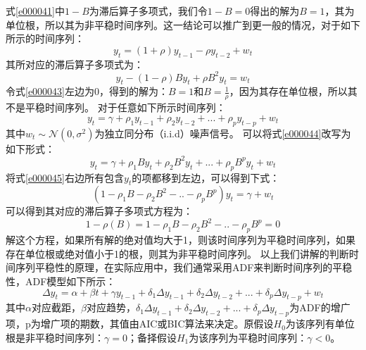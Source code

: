 \documentclass{article}
\begin{document}
式\ref{e000041}中$1-B$为滞后算子多项式，我们令$1-B=0$得出的解为$B=1$，其为单位根，所以其为非平稳时间序列。这一结论可以推广到更一般的情况，对于如下所示的时间序列：
\begin{equation}
y_{t}=(1+\rho)y_{t-1}-\rho y_{t-2}+w_{t}
\label{e000042}
\end{equation}
其所对应的滞后算子多项式为：
\begin{equation}
y_{t}-(1-\rho)By_{t}+\rho B^{2} y_{t}=w_{t}
\label{e000043}
\end{equation}
令式\ref{e000043}左边为0，得到的解为：$B=1$和$B=\frac{1}{\rho}$，因为其存在单位根，所以其不是平稳时间序列。\newline
对于任意如下所示时间序列：
\begin{equation}
y_{t}=\gamma + \rho _{1}y_{t-1} + \rho _{2}y_{t-2} + ... + \rho _{p}y_{t-p} + w_{t}
\label{e000044}
\end{equation}
其中$w_{t} \sim \mathcal{N}(0, \sigma ^{2})$为独立同分布（i.i.d）噪声信号。
可以将式\ref{e000044}改写为如下形式：
\begin{equation}
y_{t}=\gamma + \rho _{1}By_{t} + \rho _{2}B^{2}y_{t} + ...  + \rho _{p}B^{p}y_{t} + w_{t}
\label{e000045}
\end{equation}
将式\ref{e000045}右边所有包含$y_{t}$的项都移到左边，可以得到下式：
\begin{equation}
(1-\rho _{1}B - \rho _{2}B^{2} - .. - \rho _{p}B^{p})y_{t}=\gamma + w_{t}
\label{e000046}
\end{equation}
可以得到其对应的滞后算子多项式方程为：
\begin{equation}
1-\rho(B)=1-\rho _{1}B - \rho _{2}B^{2} - .. - \rho _{p}B^{p}=0
\label{e000047}
\end{equation}
解这个方程，如果所有解的绝对值均大于1，则该时间序列为平稳时间序列，如果存在单位根或绝对值小于1的根，则其为非平稳时间序列。\newline
以上我们讲解的判断时间序列平稳性的原理，在实际应用中，我们通常采用ADF来判断时间序列的平稳性，ADF模型如下所示：
\begin{equation}
\Delta y_{t}=\alpha + \beta t + \gamma y_{t-1} + \delta _{1}\Delta y_{t-1} + \delta _{2}\Delta y_{t-2} + ... + \delta _{p}\Delta y_{t-p} + w_{t}
\label{e000048}
\end{equation}
其中$\alpha$对应截距，$\beta$对应趋势，$\delta _{1}\Delta y_{t-1} + \delta _{2}\Delta y_{t-2} + ... + \delta _{p}\Delta y_{t-p}$为ADF的增广项，p为增广项的期数，其值由AIC或BIC算法来决定。原假设$H_{0}$为该序列有单位根是非平稳时间序列：$\gamma = 0$；备择假设$H_{1}$为该序列为平稳时间序列：$\gamma < 0$。\newline
\end{document}
